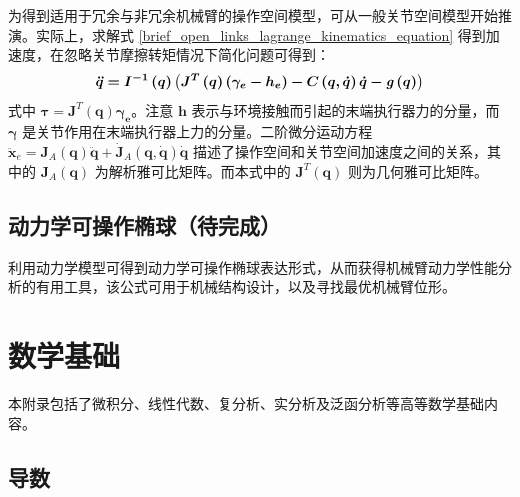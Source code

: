 \documentclass[cn,11pt,chinese,blue,bibstyle=ieeetr]{elegantbook}
\begin{document}
{为得到适用于冗余与非冗余机械臂的操作空间模型，可从一般关节空间模型开始推演。实际上，求解式 \ref{brief_open_links_lagrange_kinematics_equation} 得到加速度，在忽略关节摩擦转矩情况下简化问题可得到：
\begin{equation}
\bm{\ddot{q} = \bm{I}^{-1}\left(q\right) \left(J^T\left(q\right)\left(\gamma_e - h_e\right) - C\left(q, \dot{q}\right)\dot{q} - \textbf{\textit{g}}\left(q\right)\right)}
\end{equation}
式中 $\bm{\tau} = \bm{J}^T\left(\bm{q}\right)\bm{\gamma_e}$。注意 $\bm{h}$ 表示与环境接触而引起的末端执行器力的分量，而 $\bm{\gamma}$ 是关节作用在末端执行器上力的分量。二阶微分运动方程 $\ddot{\bm{x}}_e = \bm{J}_A\left(\bm{q}\right)\bm{\ddot{q}} + \bm{\dot{J}}_A\left(\bm{q},\bm{\dot{q}}\right)\bm{\dot{q}}$ 描述了操作空间和关节空间加速度之间的关系，其中的 $\bm{J}_A\left(\bm{q}\right)$ 为解析雅可比矩阵。而本式中的 $\bm{J}^T\left(\bm{q}\right)$ 则为几何雅可比矩阵。



\section{动力学可操作椭球（待完成）}

利用动力学模型可得到动力学可操作椭球表达形式，从而获得机械臂动力学性能分析的有用工具，该公式可用于机械结构设计，以及寻找最优机械臂位形。


\nocite{*} 





\appendix

\chapter{数学基础}


本附录包括了微积分、线性代数、复分析、实分析及泛函分析等高等数学基础内容。

\section{导数}

\usetikzlibrary{arrows,intersections}

}
\end{document}
